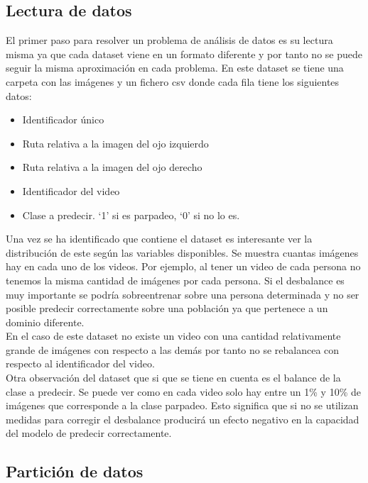 \documentclass[12pt]{article}
\begin{document}
    \subsection*{Lectura de datos}
    El primer paso para resolver un problema de análisis de datos es su lectura misma ya que cada dataset viene en un
    formato diferente y por tanto no se puede seguir la misma aproximación en cada problema.
    En este dataset se tiene una carpeta con las imágenes y un fichero csv donde cada fila tiene los siguientes datos:
    \begin{itemize}
        \item Identificador único
        \item Ruta relativa a la imagen del ojo izquierdo
        \item Ruta relativa a la imagen del ojo derecho
        \item Identificador del video
        \item Clase a predecir. ‘1’ si es parpadeo, ‘0’ si no lo es.
    \end{itemize}

    Una vez se ha identificado que contiene el dataset es interesante ver la distribución de este según las variables
    disponibles.
    Se muestra cuantas imágenes hay en cada uno de los videos.
    Por ejemplo, al tener un video de cada persona no tenemos la misma cantidad de imágenes por cada persona.
    Si el desbalance es muy importante se podría sobreentrenar sobre una persona determinada y no ser posible predecir
    correctamente sobre una población ya que pertenece a un dominio diferente.\\
    En el caso de este dataset no existe un video con una cantidad relativamente grande de imágenes con respecto a
    las demás por tanto no se rebalancea con respecto al identificador del video.\\
    Otra observación del dataset que si que se tiene en cuenta es el balance de la clase a predecir.
    Se puede ver como en cada video solo hay entre un 1\% y 10\% de imágenes que corresponde a la clase parpadeo.
    Esto significa que si no se utilizan medidas para corregir el desbalance producirá un efecto negativo en la
    capacidad del modelo de predecir correctamente.

    \newpage
    \subsection*{Partición de datos}
\end{document}
